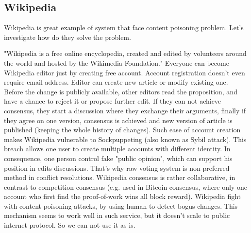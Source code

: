 \documentclass[nostrict]{szablonPG}
\begin{document}
\subsection{Wikipedia}
Wikipedia is great example of system that face content poisoning problem. Let's investigate how do they solve the problem. 

"Wikipedia is a free online encyclopedia, created and edited by volunteers around the world and hosted by the Wikimedia Foundation."
Everyone can become Wikipedia editor just by creating free account. Account registration doesn't even require email address. Editor can create new article or modify existing one. Before the change is publicly available, other editors read the proposition, and have a chance to reject it or propose further edit. If they can not achieve consensus, they start a discussion where they exchange their arguments, finally if they agree on one version, consensus is achieved and new version of article is published (keeping the whole history of changes).
Such ease of account creation makes Wikipedia vulnerable to Sockpuppeting (also known as Sybil attack). This breach allows one user to create multiple accounts with different identity. In consequence, one person control fake "public opinion", which can support his position in edits discussions. That's why raw voting system is non-preferred method in conflict resolutions. Wikipedia consensus is rather collaborative, in contrast to competition consensus (e.g. used in Bitcoin consensus, where only one account who first find the proof-of-work wins all block reward). 
Wikipedia fight with content poisoning attacks, by using human to detect bogus changes. This mechanism seems to work well in such service, but it doesn't scale to public internet protocol. So we can not use it as is.
\end{document}
